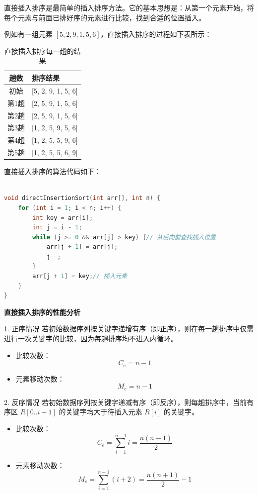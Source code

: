 \documentclass[lang=cn,newtx,10pt,scheme=chinese]{../elegantbook}
\begin{document}
直接插入排序是最简单的插入排序方法。它的基本思想是：从第一个元素开始，将每个元素与前面已排好序的元素进行比较，找到合适的位置插入。

例如有一组元素 $[5, 2, 9, 1, 5, 6]$，直接插入排序的过程如下表所示：

\begin{table}[h!]
\centering
\caption{直接插入排序每一趟的结果}
\label{tab:directInsertionSort}
\begin{tabular}{|c|l|}
\hline
\textbf{趟数} & \textbf{排序结果} \\ \hline
初始 & [5, 2, 9, 1, 5, 6] \\ \hline
第1趟 & [2, 5, 9, 1, 5, 6] \\ \hline
第2趟 & [2, 5, 9, 1, 5, 6] \\ \hline
第3趟 & [1, 2, 5, 9, 5, 6] \\ \hline
第4趟 & [1, 2, 5, 5, 9, 6] \\ \hline
第5趟 & [1, 2, 5, 5, 6, 9] \\ \hline
\end{tabular}
\end{table}

直接插入排序的算法代码如下：
\begin{lstlisting}[language=C++, caption=直接插入排序的算法代码]

void directInsertionSort(int arr[], int n) {
    for (int i = 1; i < n; i++) {
        int key = arr[i];
        int j = i - 1;
        while (j >= 0 && arr[j] > key) {// 从后向前查找插入位置
            arr[j + 1] = arr[j];
            j--;
        }
        arr[j + 1] = key;// 插入元素
    }
}
\end{lstlisting}

\textbf{直接插入排序的性能分析}

1. 正序情况  
   若初始数据序列按关键字递增有序（即正序），则在每一趟排序中仅需进行一次关键字的比较，因为每趟排序均不进入内循环。  
   \begin{itemize}
     \item 比较次数：  
       \[
       C_e = n - 1
       \]
     \item 元素移动次数：  
       \[
       M_e = n - 1
       \]
   \end{itemize}

2. 反序情况  
   若初始数据序列按关键字递减有序（即反序），则每趟排序中，当前有序区 $R[0..i-1]$ 的关键字均大于待插入元素 $R[i]$ 的关键字。  
   \begin{itemize}
     \item 比较次数：  
       \[
       C_e = \sum_{i=1}^{n-1} i = \frac{n(n-1)}{2}
       \]
     \item 元素移动次数：  
       \[
       M_e = \sum_{i=1}^{n-1} (i + 2) = \frac{n(n+1)}{2} - 1
       \]
   \end{itemize}
\end{document}
